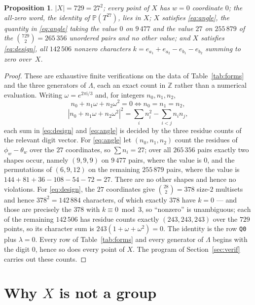 \documentclass[11pt]{amsart}
\newtheorem{proposition}[theorem]{Proposition}
\theoremstyle{remark}
\begin{document}
\begin{proposition}\label{prop:hyp}
$|X|=729=27^{2}$; every point of $X$ has $w=0$ coordinate $0$; the all-zero
word, the identity of $\mathbb P(T^{27})$, lies in $X$; $X$ satisfies
\eqref{eq:angle}, the quantity in \eqref{eq:angle} taking the value $0$ on
$9\,477$ and the value $27$ on $255\,879$ of the $\binom{729}{2}=265\,356$
unordered pairs and no other value; and $X$
satisfies \eqref{eq:design}, all $142\,506$ nonzero characters
$k=e_{a_{1}}+e_{a_{2}}-e_{b_{1}}-e_{b_{2}}$ summing to zero over~$X$.
\end{proposition}

\begin{proof}
These are exhaustive finite verifications on the data of
Table~\ref{tab:forms} and the three generators of $\Lambda$, each an exact count
in $\mathbb Z$ rather than a numerical evaluation. Writing
$\omega=e^{2\pi\mathrm i/3}$ and, for integers $n_{0},n_{1},n_{2}$,
\[
  n_{0}+n_{1}\omega+n_{2}\omega^{2}=0
  \iff n_{0}=n_{1}=n_{2},
\]
\[
  |n_{0}+n_{1}\omega+n_{2}\omega^{2}|^{2}
  =\sum_{i} n_{i}^{2}-\sum_{i<j}n_{i}n_{j},
\]
each sum in \eqref{eq:design} and \eqref{eq:angle} is decided by the three
residue counts of the relevant digit vector. For \eqref{eq:angle} let
$(n_{0},n_{1},n_{2})$ count the residues of $\phi_{w}-\theta_{w}$ over the $27$
coordinates, so $\sum n_{i}=27$; over all $265\,356$ pairs exactly two shapes
occur, namely $(9,9,9)$ on $9\,477$ pairs, where the value is $0$, and the
permutations of $(6,9,12)$ on the remaining $255\,879$ pairs, where the value is
$144+81+36-108-54-72=27$. There are no other shapes and hence no violations. For
\eqref{eq:design}, the $27$
coordinates give $\binom{28}{2}=378$ size-$2$ multisets and hence
$378^{2}=142\,884$ characters, of which exactly $378$ have $k=0$ --- and those
are precisely the $378$ with $k\equiv0\bmod 3$, so ``nonzero'' is unambiguous;
each of the remaining $142\,506$ has residue counts exactly $(243,243,243)$ over
the $729$ points, so its character sum is $243(1+\omega+\omega^{2})=0$. The
identity is the row \texttt{Q0} plus $\lambda=0$. Every row of
Table~\ref{tab:forms} and every generator of $\Lambda$ begins with the digit
$0$, hence so does every point of $X$. The program of
Section~\ref{sec:verif} carries out these counts.
\end{proof}

\section{Why \texorpdfstring{$X$}{X} is not a group}\label{sec:arg}
\end{document}
